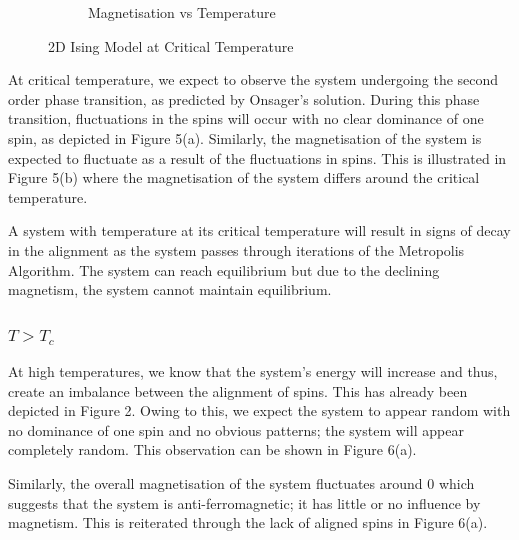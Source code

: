 \documentclass[a4paper]{article}
\begin{document}
\begin{figure}[h]
\begin{subfigure}{0.5\textwidth}
\caption{Magnetisation vs Temperature}
\label{fig:subim2}
\end{subfigure}
\caption{2D Ising Model at Critical Temperature}
\label{fig:image2}
\end{figure}

At critical temperature, we expect to observe the system undergoing the second order phase transition, as predicted by Onsager's solution. During this phase transition, fluctuations in the spins will occur with no clear dominance of one spin, as depicted in Figure 5(a). Similarly, the magnetisation of the system is expected to fluctuate as a result of the fluctuations in spins. This is illustrated in Figure 5(b) where the magnetisation of the system differs around the critical temperature. 

A system with temperature at its critical temperature will result in signs of decay in the alignment as the system passes through iterations of the Metropolis Algorithm. The system can reach equilibrium but due to the declining magnetism, the system cannot maintain equilibrium.

\subsubsection{$T > T_{c}$}

At high temperatures, we know that the system's energy will increase and thus, create an imbalance between the alignment of spins. This has already been depicted in Figure 2. Owing to this, we expect the system to appear random with no dominance of one spin and no obvious patterns; the system will appear completely random. This observation can be shown in Figure 6(a). 

Similarly, the overall magnetisation of the system fluctuates around 0 which suggests that the system is anti-ferromagnetic; it has little or no influence by magnetism. This is reiterated through the lack of aligned spins in Figure 6(a). 
\end{document}
